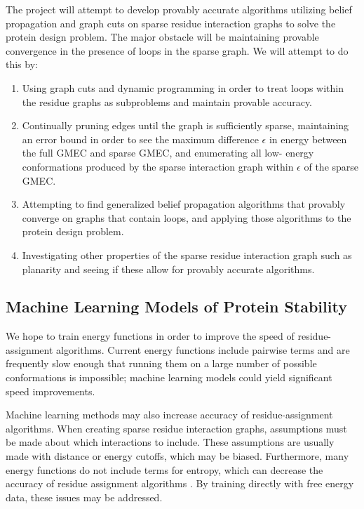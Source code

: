 \documentclass[11pt]{article}
\begin{document}
	The project will attempt to develop provably accurate algorithms utilizing
	belief propagation and graph cuts on sparse residue interaction graphs to solve
	the protein design problem. The major obstacle will be maintaining provable
	convergence in the presence of loops in the sparse graph. We will attempt to do
	this by:
	
	\begin{enumerate}
		\item Using graph cuts and dynamic programming in order to treat loops within
		the residue graphs as subproblems and maintain provable accuracy. 
		
		\item Continually pruning edges until the graph is sufficiently sparse, 
		maintaining an error bound in order to see the maximum difference $\epsilon$
		in energy between the full GMEC and sparse GMEC, and enumerating all low-
		energy conformations produced by the sparse interaction graph within $\epsilon$
		of the sparse GMEC.  
		
		\item Attempting to find generalized belief propagation algorithms that provably
		converge on graphs that contain loops, and applying those algorithms to the
		protein design problem.
		
		\item Investigating other properties of the sparse residue interaction graph
		such as planarity and seeing if these allow for provably accurate algorithms.
	\end{enumerate}
	
	\subsection{Machine Learning Models of Protein Stability}
	We hope to train energy functions in order to
	improve the speed of residue-assignment algorithms. Current energy
	functions include pairwise terms and are frequently slow enough that running
	them on a large number of possible conformations is impossible; machine 
	learning models could yield significant speed improvements. 
	
	Machine learning methods may also increase accuracy of residue-assignment 
	algorithms.  When creating sparse residue interaction graphs, assumptions
	must be made about which interactions to include.  These assumptions are
	usually made with distance or energy cutoffs, which may be biased. Furthermore,
	many energy functions do not include terms for entropy, which can decrease the
	accuracy of residue assignment algorithms \cite{SKNCAKRST13}. By training
	directly with free energy data, these issues may be addressed.
	
\end{document}
